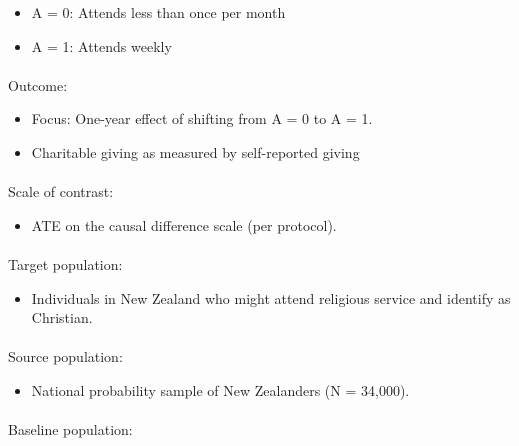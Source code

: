 \documentclass[
  singlecolumn]{article}
\makeatletter
\let\oldparagraph\paragraph
\renewcommand{\paragraph}{
    \@ifstar
      \xxxParagraphStar
      \xxxParagraphNoStar
  }
\newcommand{\xxxParagraphStar}[1]{\oldparagraph*{#1}\mbox{}}
\newcommand{\xxxParagraphNoStar}[1]{\oldparagraph{#1}\mbox{}}
\providecommand{\tightlist}{%
  \setlength{\itemsep}{0pt}\setlength{\parskip}{0pt}}\usepackage{longtable,booktabs,array}
\makeatother
\begin{document}
\begin{itemize}
\tightlist
\item
  A = 0: Attends less than once per month
\item
  A = 1: Attends weekly
\end{itemize}

\paragraph{Outcome:}\label{outcome}

\begin{itemize}
\tightlist
\item
  Focus: One-year effect of shifting from A = 0 to A = 1.
\item
  Charitable giving as measured by self-reported giving
\end{itemize}

\paragraph{Scale of contrast:}\label{scale-of-contrast}

\begin{itemize}
\tightlist
\item
  ATE on the causal difference scale (per protocol).
\end{itemize}

\paragraph{Target population:}\label{target-population}

\begin{itemize}
\tightlist
\item
  Individuals in New Zealand who might attend religious service and
  identify as Christian.
\end{itemize}

\paragraph{Source population:}\label{source-population}

\begin{itemize}
\tightlist
\item
  National probability sample of New Zealanders (N = 34,000).
\end{itemize}

\paragraph{Baseline population:}\label{baseline-population}
\end{document}
